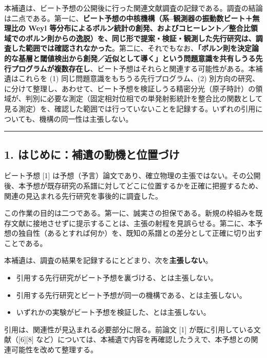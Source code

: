 \documentclass[
]{ltjsarticle}
\providecommand{\tightlist}{%
  \setlength{\itemsep}{0pt}\setlength{\parskip}{0pt}}
\begin{document}
本補遺は、ビート予想の公開後に行った関連文献調査の記録である。調査の結論は二点である。第一に、\textbf{ビート予想の中核機構（系--観測器の振動数ビート＋無理比の
Weyl
等分布によるボルン統計の創発、およびコヒーレント／整合比領域でのボルン則からの逸脱）を、同じ形で提案・検証・観測した先行研究は、調査した範囲では確認されなかった}。第二に、それでもなお、\textbf{「ボルン則を決定論的な基層と閾値検出から創発／近似として導く」という問題意識を共有しうる先行プログラムが複数存在し}、ビート予想はそれらと関連する可能性がある。本補遺はこれらを
(1) 同じ問題意識をもちうる先行プログラム、(2)
別方向の研究、に分けて整理し、あわせて、ビート予想を検証しうる精密分光（原子時計）の領域が、判別に必要な測定（固定相対位相での単発射影統計を整合比の関数として見る測定）を、確認した範囲では行っていないことを記録する。いずれの引用についても、機構の同一性は主張しない。

\begin{center}\rule{0.5\linewidth}{0.5pt}\end{center}

\subsection{1.
はじめに：補遺の動機と位置づけ}\label{ux306fux3058ux3081ux306bux88dcux907aux306eux52d5ux6a5fux3068ux4f4dux7f6eux3065ux3051}

ビート予想 {[}1{]}
は予想（予言）論文であり、確立物理の主張ではない。その公開後、本予想が既存研究の系譜に対してどこに位置するかを正確に把握するため、関連の見込まれる先行研究を事後的に調査した。

この作業の目的は二つである。第一に、誠実さの担保である。新規の枠組みを既存文献に接地させずに提示することは、主張の射程を見誤らせる。第二に、本予想の独自性（あるとすれば何か）を、既知の系譜との差分として正確に切り出すことである。

本補遺は、調査の結果を記録するにとどまり、次を\textbf{主張しない}。

\begin{itemize}
\tightlist
\item
  引用する先行研究がビート予想を裏づける、とは主張しない。
\item
  引用する先行研究とビート予想が同一の機構である、とは主張しない。
\item
  いずれかの実験がビート予想を検証した、とは主張しない。
\end{itemize}

引用は、関連性が見込まれる必要部分に限る。前論文 {[}1{]}
が既に引用している文献（{[}6{]}{[}8{]}
など）については、本補遺で内容を再確認したうえで、本予想との関連可能性を改めて整理する。
\end{document}
